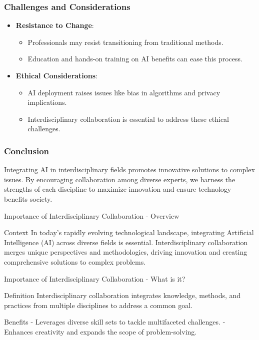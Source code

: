 \documentclass[aspectratio=169]{beamer}
\begin{document}
\begin{frame}[fragile]
    \frametitle{Challenges and Considerations}
    \begin{itemize}
        \item \textbf{Resistance to Change}:
            \begin{itemize}
                \item Professionals may resist transitioning from traditional methods. 
                \item Education and hands-on training on AI benefits can ease this process.
            \end{itemize}
        \item \textbf{Ethical Considerations}:
            \begin{itemize}
                \item AI deployment raises issues like bias in algorithms and privacy implications.
                \item Interdisciplinary collaboration is essential to address these ethical challenges.
            \end{itemize}
    \end{itemize}
\end{frame}

\begin{frame}[fragile]
    \frametitle{Conclusion}
    Integrating AI in interdisciplinary fields promotes innovative solutions to complex issues. By encouraging collaboration among diverse experts, we harness the strengths of each discipline to maximize innovation and ensure technology benefits society.
\end{frame}

\begin{frame}[fragile]{Importance of Interdisciplinary Collaboration - Overview}
  \begin{block}{Context}
    In today’s rapidly evolving technological landscape, integrating Artificial Intelligence (AI) across diverse fields is essential. Interdisciplinary collaboration merges unique perspectives and methodologies, driving innovation and creating comprehensive solutions to complex problems.
  \end{block}
\end{frame}

\begin{frame}[fragile]{Importance of Interdisciplinary Collaboration - What is it?}
  \begin{block}{Definition}
    Interdisciplinary collaboration integrates knowledge, methods, and practices from multiple disciplines to address a common goal. 
  \end{block}
  
  \begin{block}{Benefits}
    - Leverages diverse skill sets to tackle multifaceted challenges.
    - Enhances creativity and expands the scope of problem-solving.
  \end{block}
\end{frame}
\end{document}
